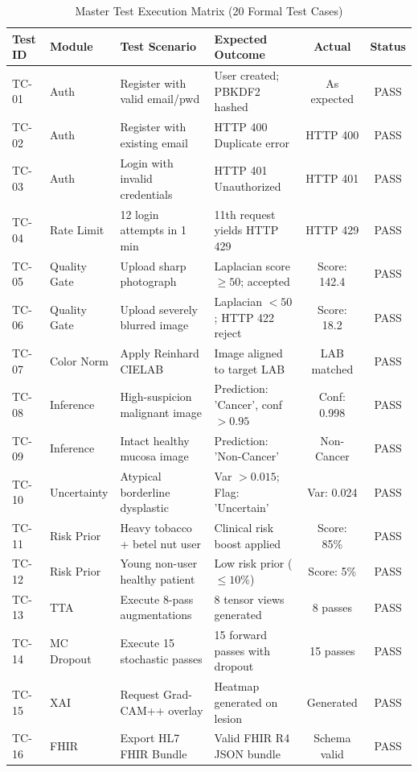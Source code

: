 \documentclass[12pt,a4paper,oneside]{report}
\begin{document}
\begin{table}[H]
\centering
\small
\caption{Master Test Execution Matrix (20 Formal Test Cases)}
\label{tab:test_execution_matrix}
\begin{tabularx}{\textwidth}{l p{2.0cm} p{3.2cm} p{3.2cm} c c}
\toprule
\textbf{Test ID} & \textbf{Module} & \textbf{Test Scenario} & \textbf{Expected Outcome} & \textbf{Actual} & \textbf{Status} \\
\midrule
TC-01 & Auth & Register with valid email/pwd & User created; PBKDF2 hashed & As expected & PASS \\
TC-02 & Auth & Register with existing email & HTTP 400 Duplicate error & HTTP 400 & PASS \\
TC-03 & Auth & Login with invalid credentials & HTTP 401 Unauthorized & HTTP 401 & PASS \\
TC-04 & Rate Limit & 12 login attempts in 1 min & 11th request yields HTTP 429 & HTTP 429 & PASS \\
TC-05 & Quality Gate & Upload sharp photograph & Laplacian score $\ge 50$; accepted & Score: 142.4 & PASS \\
TC-06 & Quality Gate & Upload severely blurred image & Laplacian $< 50$; HTTP 422 reject & Score: 18.2 & PASS \\
TC-07 & Color Norm & Apply Reinhard CIELAB & Image aligned to target LAB & LAB matched & PASS \\
TC-08 & Inference & High-suspicion malignant image & Prediction: 'Cancer', conf $> 0.95$ & Conf: 0.998 & PASS \\
TC-09 & Inference & Intact healthy mucosa image & Prediction: 'Non-Cancer' & Non-Cancer & PASS \\
TC-10 & Uncertainty & Atypical borderline dysplastic & Var $> 0.015$; Flag: 'Uncertain' & Var: 0.024 & PASS \\
TC-11 & Risk Prior & Heavy tobacco + betel nut user & Clinical risk boost applied & Score: 85\% & PASS \\
TC-12 & Risk Prior & Young non-user healthy patient & Low risk prior ($\le 10\%$) & Score: 5\% & PASS \\
TC-13 & TTA & Execute 8-pass augmentations & 8 tensor views generated & 8 passes & PASS \\
TC-14 & MC Dropout & Execute 15 stochastic passes & 15 forward passes with dropout & 15 passes & PASS \\
TC-15 & XAI & Request Grad-CAM++ overlay & Heatmap generated on lesion & Generated & PASS \\
TC-16 & FHIR & Export HL7 FHIR Bundle & Valid FHIR R4 JSON bundle & Schema valid & PASS \\

\end{tabularx}
\end{table}
\end{document}
